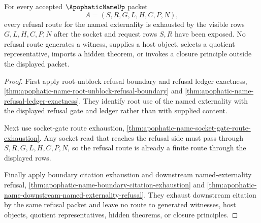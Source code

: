 \begin{theorem}
\label{thm:apophatic-name-refusal-route-exhaustion}
For every accepted $\ApophaticNameUp$ packet
$$
A=(S,R,G,L,H,C,P,N),
$$
every refusal route for the named externality is exhausted by the visible rows $G,L,H,C,P,N$ after the socket and request rows $S,R$ have been exposed. No refusal route generates a witness, supplies a host object, selects a quotient representative, imports a hidden theorem, or invokes a closure principle outside the displayed packet.
\end{theorem}
\begin{proof}
First apply root-unblock refusal boundary and refusal ledger exactness, \autoref{thm:apophatic-name-root-unblock-refusal-boundary} and \autoref{thm:apophatic-name-refusal-ledger-exactness}. They identify root use of the named externality with the displayed refusal gate and ledger rather than with supplied content.

Next use socket-gate route exhaustion, \autoref{thm:apophatic-name-socket-gate-route-exhaustion}. Any socket read that reaches the refusal side must pass through $S,R,G,L,H,C,P,N$, so the refusal route is already a finite route through the displayed rows.

Finally apply boundary citation exhaustion and downstream named-externality refusal, \autoref{thm:apophatic-name-boundary-citation-exhaustion} and \autoref{thm:apophatic-name-downstream-named-externality-refusal}. They exhaust downstream citation by the same refusal packet and leave no route to generated witnesses, host objects, quotient representatives, hidden theorems, or closure principles.
\end{proof}

